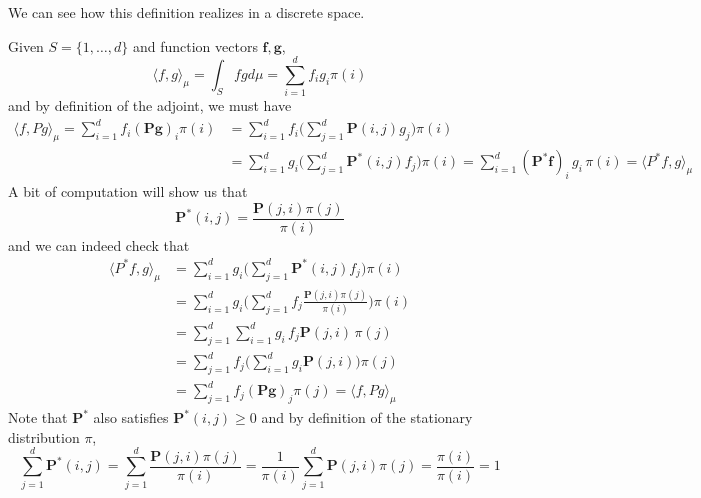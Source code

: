 \documentclass{article}
\begin{document}
      We can see how this definition realizes in a discrete space. 

      \begin{example}
      Given $S = \{1, \ldots, d\}$ and function vectors $\mathbf{f}, \mathbf{g}$, 
      \[\langle f, g \rangle_\mu = \int_S f g d\mu = \sum_{i=1}^d f_i g_i \pi(i)\]
      and by definition of the adjoint, we must have 
      \begin{align*}
          \langle f, P g \rangle_\mu = \sum_{i=1}^d f_i (\mathbf{P} \mathbf{g})_i \pi(i) & = \sum_{i=1}^d f_i \bigg( \sum_{j=1}^d \mathbf{P}(i, j) g_j \bigg) \pi(i) \\
          & = \sum_{i=1}^d g_i \bigg( \sum_{j=1}^d \mathbf{P}^* (i, j) f_j \bigg) \pi(i) = \sum_{i=1}^d (\mathbf{P}^* \mathbf{f})_i \, g_i \, \pi(i) = \langle P^* f, g \rangle_\mu 
      \end{align*}
      A bit of computation will show us that 
      \[\mathbf{P}^*(i, j) = \frac{\mathbf{P}(j, i) \pi(j)}{\pi(i)}\]
      and we can indeed check that 
      \begin{align*}
          \langle P^* f, g \rangle_\mu  & = \sum_{i=1}^d g_i \bigg( \sum_{j=1}^d \mathbf{P}^* (i, j) f_j \bigg) \pi(i) \\
          & = \sum_{i=1}^d g_i \bigg( \sum_{j=1}^d f_j \frac{\mathbf{P}(j, i) \pi(j)}{\pi(i)} \bigg) \pi(i) \\
          & = \sum_{j=1}^d \sum_{i=1}^d g_i \, f_j \mathbf{P}(j, i) \, \pi(j) \\
          & = \sum_{j=1}^d f_j \bigg( \sum_{i=1}^d g_i \mathbf{P}(j, i) \bigg) \pi(j) \\
          & = \sum_{j=1}^d f_j (\mathbf{P} \mathbf{g})_j \pi(j) = \langle f, P g \rangle_\mu
      \end{align*}
      Note that $\mathbf{P}^*$ also satisfies $\mathbf{P}^* (i, j) \geq 0$ and by definition of the stationary distribution $\pi$, 
      \[\sum_{j=1}^d \mathbf{P}^* (i, j) = \sum_{j=1}^d \frac{\mathbf{P}(j, i) \pi(j)}{\pi(i)} = \frac{1}{\pi(i)} \sum_{j=1}^d \mathbf{P}(j, i) \pi(j) = \frac{\pi(i)}{\pi(i)} = 1 \]
      \end{example}
\end{document}
